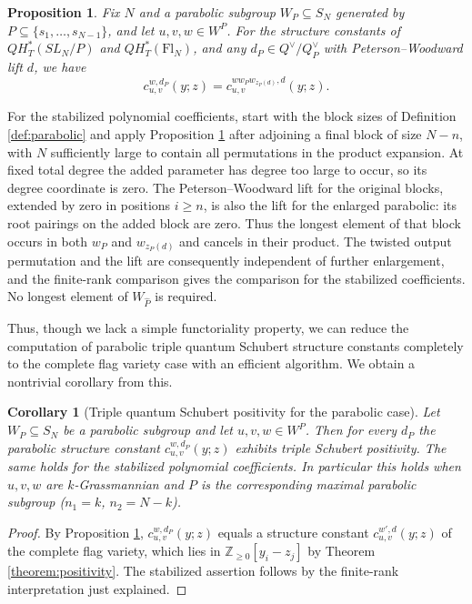 \documentclass{amsart}
\newtheorem{corollary}[lemma]{Corollary}
\newtheorem{proposition}[lemma]{Proposition}
\theoremstyle{definition}
\theoremstyle{remark}
\numberwithin{equation}{section}
\newcommand{\pcomp}[1]{\widehat{#1}}
\begin{document}
 \begin{proposition} \label{prop:parabolic}
Fix $N$ and a parabolic subgroup $W_P\subseteq S_N$ generated by $P\subseteq\{s_1,\ldots,s_{N-1}\}$, and let $u,v,w\in W^{P}$. For the structure constants of $QH_T^*(SL_N/P)$ and $QH_T^*(\mathrm{Fl}_N)$, and any $d_P\in Q^\vee/Q_P^\vee$ with Peterson--Woodward lift $d$, we have
$$c_{u,v}^{w,d_P}(y;z) = c_{u,v}^{ww_Pw_{z_P(d)},d}(y;z).$$
\end{proposition}

For the stabilized polynomial coefficients, start with the block sizes of Definition \ref{def:parabolic} and apply Proposition \ref{prop:parabolic} after adjoining a final block of size $N-n$, with $N$ sufficiently large to contain all permutations in the product expansion. At fixed total degree the added parameter has degree too large to occur, so its degree coordinate is zero. The Peterson--Woodward lift for the original blocks, extended by zero in positions $i\geq n$, is also the lift for the enlarged parabolic: its root pairings on the added block are zero. Thus the longest element of that block occurs in both $w_P$ and $w_{z_P(d)}$ and cancels in their product. The twisted output permutation and the lift are consequently independent of further enlargement, and the finite-rank comparison gives the comparison for the stabilized coefficients. No longest element of $W_{\pcomp P}$ is required.

Thus, though we lack a simple functoriality property, we can reduce the computation of parabolic triple quantum Schubert structure constants completely to the complete flag variety case with an efficient algorithm. We obtain a nontrivial corollary from this.

\begin{corollary}[Triple quantum Schubert positivity for the parabolic case] \label{corollary:parabolicpositivity}
Let $W_P\subseteq S_N$ be a parabolic subgroup and let $u,v,w\in W^P$. Then for every $d_P$ the parabolic structure constant $c_{u,v}^{w,d_P}(y;z)$ exhibits triple Schubert positivity. The same holds for the stabilized polynomial coefficients. In particular this holds when $u,v,w$ are $k$-Grassmannian and $P$ is the corresponding maximal parabolic subgroup ($n_1=k$, $n_2=N-k$).
\end{corollary}
\begin{proof}
By Proposition \ref{prop:parabolic}, $c_{u,v}^{w,d_P}(y;z)$ equals a structure constant $c_{u,v}^{w',d}(y;z)$ of the complete flag variety, which lies in $\mathbb Z_{\geq0}[y_i-z_j]$ by Theorem \ref{theorem:positivity}. The stabilized assertion follows by the finite-rank interpretation just explained.
\end{proof}
\end{document}
